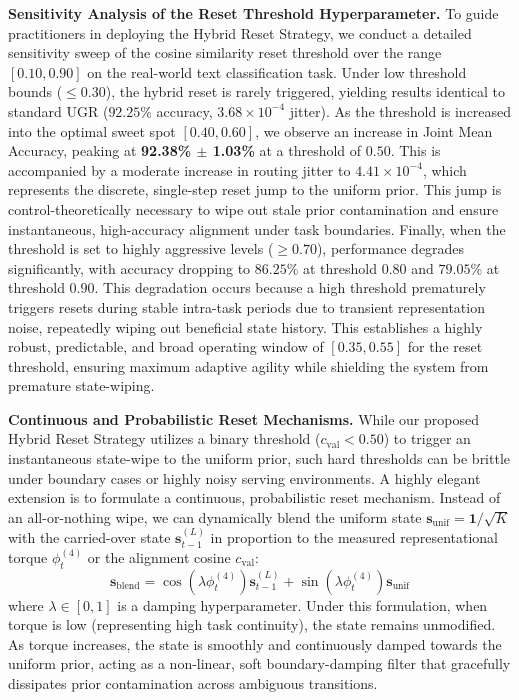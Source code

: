 \textbf{Sensitivity Analysis of the Reset Threshold Hyperparameter.} To guide practitioners in deploying the Hybrid Reset Strategy, we conduct a detailed sensitivity sweep of the cosine similarity reset threshold over the range $[0.10, 0.90]$ on the real-world text classification task. Under low threshold bounds ($\le 0.30$), the hybrid reset is rarely triggered, yielding results identical to standard UGR ($92.25\%$ accuracy, $3.68 \times 10^{-4}$ jitter). As the threshold is increased into the optimal sweet spot $[0.40, 0.60]$, we observe an increase in Joint Mean Accuracy, peaking at \textbf{92.38\% $\pm$ 1.03\%} at a threshold of $0.50$. This is accompanied by a moderate increase in routing jitter to $4.41 \times 10^{-4}$, which represents the discrete, single-step reset jump to the uniform prior. This jump is control-theoretically necessary to wipe out stale prior contamination and ensure instantaneous, high-accuracy alignment under task boundaries. Finally, when the threshold is set to highly aggressive levels ($\ge 0.70$), performance degrades significantly, with accuracy dropping to $86.25\%$ at threshold $0.80$ and $79.05\%$ at threshold $0.90$. This degradation occurs because a high threshold prematurely triggers resets during stable intra-task periods due to transient representation noise, repeatedly wiping out beneficial state history. This establishes a highly robust, predictable, and broad operating window of $[0.35, 0.55]$ for the reset threshold, ensuring maximum adaptive agility while shielding the system from premature state-wiping.

\textbf{Continuous and Probabilistic Reset Mechanisms.} While our proposed Hybrid Reset Strategy utilizes a binary threshold ($c_{\text{val}} < 0.50$) to trigger an instantaneous state-wipe to the uniform prior, such hard thresholds can be brittle under boundary cases or highly noisy serving environments. A highly elegant extension is to formulate a continuous, probabilistic reset mechanism. Instead of an all-or-nothing wipe, we can dynamically blend the uniform state $\mathbf{s}_{\text{unif}} = \mathbf{1}/\sqrt{K}$ with the carried-over state $\mathbf{s}_{t-1}^{(L)}$ in proportion to the measured representational torque $\phi_t^{(4)}$ or the alignment cosine $c_{\text{val}}$:
\begin{equation}
\mathbf{s}_{\text{blend}} = \cos\left(\lambda \phi_t^{(4)}\right) \mathbf{s}_{t-1}^{(L)} + \sin\left(\lambda \phi_t^{(4)}\right) \mathbf{s}_{\text{unif}}
\end{equation}
where $\lambda \in [0, 1]$ is a damping hyperparameter. Under this formulation, when torque is low (representing high task continuity), the state remains unmodified. As torque increases, the state is smoothly and continuously damped towards the uniform prior, acting as a non-linear, soft boundary-damping filter that gracefully dissipates prior contamination across ambiguous transitions.

